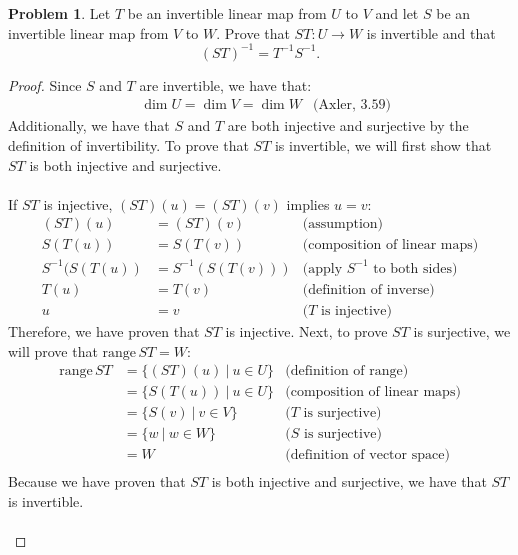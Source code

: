 \documentclass[12pt,reqno]{article}
\theoremstyle{definition}
\newtheorem{problem}{Problem}
\begin{document}
\newpage


\begin{problem}
    Let $T$ be an invertible linear map from $U$ to $V$ and let $S$ be an invertible linear map from $V$ to $W$. Prove that $ST: U\rightarrow W$ is invertible and that 
    $$
    (ST)^{-1} = T^{-1} S^{-1}.
    $$
\end{problem}
\begin{proof}
    Since $S$ and $T$ are invertible, we have that:
    \begin{align*} 
        &\dim U = \dim V = \dim W & \text{(Axler, 3.59)}
    \end{align*}
    Additionally, we have that $S$ and $T$ are both injective and surjective by the definition of invertibility. To prove that $ST$ is invertible, we will first show that $ST$ is both injective and surjective.
    \\\\
    If $ST$ is injective, $(ST)(u) = (ST)(v)$ implies $u=v$:
    \begin{align*}
        (ST)(u)&=(ST)(v) &\text{(assumption)}\\
        S(T(u))&=S(T(v)) &\text{(composition of linear maps)}\\
        S^{-1}(S(T(u))&= S^{-1}(S(T(v))) &\text{(apply $S^{-1}$ to both sides)}\\
        T(u)&=T(v) &\text{(definition of inverse)}\\
        u&=v &\text{($T$ is injective)}
    \end{align*}
    Therefore, we have proven that $ST$ is injective. Next, to prove $ST$ is surjective, we will prove that $\mathrm{range}\,ST = W$:
    \begin{align*}
        \mathrm{range}\,ST &= \{(ST)(u)\ |\ u\in U\} &\text{(definition of range)}\\
        &= \{S(T(u))\ |\ u\in U\} &\text{(composition of linear maps)}\\
        &= \{S(v)\ |\ v\in V\} &\text{($T$ is surjective)}\\
        &= \{w\ |\ w\in W\} &\text{($S$ is surjective)}\\
        &= W &\text{(definition of vector space)}\\
    \end{align*}
    Because we have proven that $ST$ is both injective and surjective, we have that $ST$ is invertible.
    \\\\

\end{proof}
\end{document}
